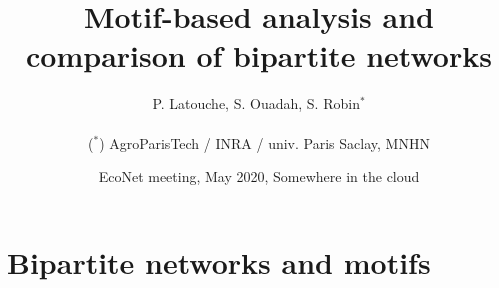 \documentclass[8pt]{beamer}
\begin{document}
\title{Motif-based analysis and comparison of bipartite networks}
\author[S. Robin]{P. Latouche, S. Ouadah, S. Robin$^*$ \\ ~\\
  {\small ($^*$) AgroParisTech / INRA / univ. Paris Saclay, MNHN}}
\date[EcoNet, May'20]{EcoNet meeting, May 2020, Somewhere in the cloud}
\maketitle

\section{Bipartite networks and motifs}
\end{document}
